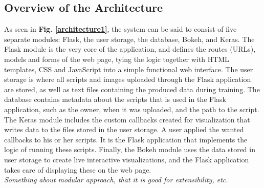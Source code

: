 \subsection{Overview of the Architecture}

As seen in \textbf{Fig. \ref{architecture1}}, the system can be said to consist of five separate modules: Flask, the user storage, the database, Bokeh, and Keras. The Flask module is the very core of the application, and defines the routes (URLs), models and forms of the web page, tying the logic together with HTML templates, CSS and JavaScript into a simple functional web interface. The user storage is where all scripts and images uploaded through the Flask application are stored, as well as text files containing the produced data during training. The database contains metadata about the scripts that is used in the Flask application, such as the owner, when it was uploaded, and the path to the script. The Keras module includes the custom callbacks created for visualization that writes data to the files stored in the user storage. A user applied the wanted callbacks to his or her scripts. It is the Flask application that implements the logic of running these scripts. Finally, the Bokeh module uses the data stored in user storage to create live interactive visualizations, and the Flask application takes care of displaying these on the web page. \\

\noindent \textit{Something about modular approach, that it is good for extensibility, etc.}


